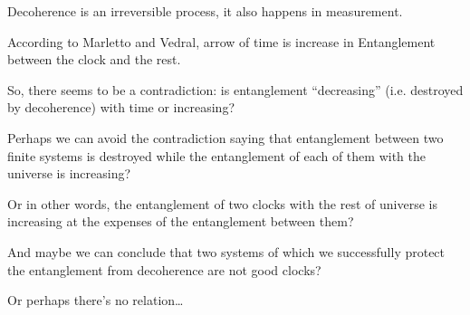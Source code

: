 Decoherence is an irreversible process, it also happens in measurement.

According to Marletto and Vedral, arrow of time is increase in Entanglement
between the clock and the rest.

So, there seems to be a contradiction: is entanglement ``decreasing''
(i.e. destroyed by decoherence) with time
or increasing?

Perhaps we can avoid the contradiction saying that
entanglement between two finite systems is
destroyed while the entanglement of each of them with the universe
is increasing?

Or in other words, the entanglement of two clocks with the rest of universe
is increasing at the expenses of the entanglement between them?

And maybe we can conclude that two systems  of which we successfully
protect the entanglement from decoherence are not good clocks?

Or perhaps there's no relation\dots